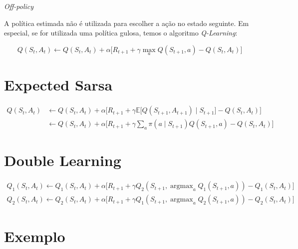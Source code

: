 \documentclass{article}
\DeclareMathOperator*{\argmax}{argmax}
\begin{document}
        \textit{Off-policy}
        
        A política estimada não é utilizada para escolher a ação no estado seguinte. Em especial, se for utilizada uma política gulosa, temos o algoritmo \textit{Q-Learning}:
    
        \begin{equation}
            Q(S_t, A_t) \leftarrow Q(S_t, A_t) + \alpha \Big[ R_{t+1} + \gamma \max_{a} Q(S_{t+1}, a) - Q(S_t, A_t) \Big]
        \end{equation}
    
    \section{Expected Sarsa}
    
        \begin{equation}
        \begin{split}
            Q(S_t, A_t) & \leftarrow Q(S_t, A_t) + \alpha \Big[ R_{t+1} + \gamma \mathbb{E} \big[ Q(S_{t+1}, A_{t+1}) \mid S_{t+1} \big] - Q(S_t, A_t) \Big] \\
            & \leftarrow Q(S_t, A_t) + \alpha \Big[ R_{t+1} + \gamma \sum_a \pi(a \mid S_{t+1}) Q(S_{t+1},a) - Q(S_t, A_t) \Big]
        \end{split}
        \end{equation}
        
    \section{Double Learning}
    
        \begin{equation}
        \begin{split}
            Q_{1}(S_t, A_t) \leftarrow Q_{1}(S_t, A_t) + \alpha \Big[ R_{t+1} + \gamma Q_{2}(S_{t+1}, \argmax_a Q_{1}(S_{t+1}, a)) - Q_{1}(S_t, A_t) \Big] \\
            Q_{2}(S_t, A_t) \leftarrow Q_{2}(S_t, A_t) + \alpha \Big[ R_{t+1} + \gamma Q_{1}(S_{t+1}, \argmax_a Q_{2}(S_{t+1}, a)) - Q_{2}(S_t, A_t) \Big]
        \end{split}
        \end{equation}
    
    \section{Exemplo}
    
\end{document}
